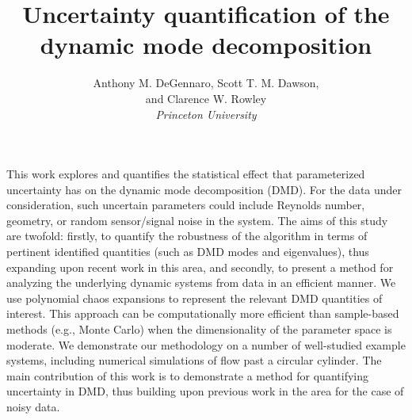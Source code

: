 \documentclass[12pt]{article}
\title{Uncertainty quantification of the dynamic mode decomposition}
\author{%
  Anthony M. DeGennaro, 
  Scott T. M. Dawson, \\ and
  Clarence W. Rowley\\
  \itshape
   Princeton University\\
 }
\begin{document}
\maketitle

 This work explores and quantifies the statistical effect that
 parameterized uncertainty has on the dynamic mode decomposition
 (DMD).  For the data under consideration, such uncertain parameters
 could include Reynolds number, geometry, or random {\color{green}
   sensor/signal} noise in the system.  The aims of this study are
 twofold: firstly, to quantify the robustness of the algorithm in
 terms of pertinent identified quantities (such as DMD modes and
 eigenvalues), thus expanding upon recent work in this area, and 
 secondly, to present a method for analyzing the
 underlying dynamic systems from data in an efficient
 manner. {\color{green} We use polynomial chaos expansions to
   represent the relevant DMD quantities of interest. This approach}
 can be computationally more efficient than sample-based methods
 (e.g., Monte Carlo) when the dimensionality of the parameter space is
 moderate.  We demonstrate our methodology on a number
 of well-studied example systems, including numerical simulations of
 flow past a circular cylinder. {\color{green} The main contribution
   of this work is to demonstrate a method for quantifying uncertainty
   in DMD, thus building upon previous work in the area for the case of noisy data.}
\end{document}
